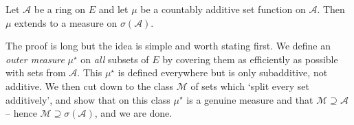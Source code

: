 \documentclass[a4paper]{scrartcl}
\newcommand{\cA}{\mathcal{A}}
\newcommand{\cM}{\mathcal{M}}
\begin{document}
\begin{theorem}\label{thm:caratheodory}
	Let $\cA$ be a ring on $E$ and let $\mu$ be a countably additive set function on $\cA$. Then $\mu$ extends to a measure on $\sigma(\cA)$.
\end{theorem}

The proof is long but the idea is simple and worth stating first. We define an \emph{outer measure} $\mu^\star$ on \emph{all} subsets of $E$ by covering them as efficiently as possible with sets from $\cA$. This $\mu^\star$ is defined everywhere but is only subadditive, not additive. We then cut down to the class $\cM$ of sets which `split every set additively', and show that on this class $\mu^\star$ is a genuine measure and that $\cM \supseteq \cA$ -- hence $\cM \supseteq \sigma(\cA)$, and we are done.
\end{document}
